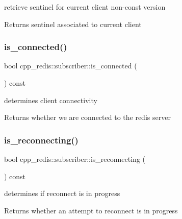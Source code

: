 retrieve sentinel for current client non-\/const version

\begin{DoxyReturn}{Returns}
sentinel associated to current client 
\end{DoxyReturn}
\mbox{\label{classcpp__redis_1_1subscriber_af73acfc3c1859e6b32bc9a69856e6e59}} 
\subsubsection{\texorpdfstring{is\+\_\+connected()}{is\_connected()}}
{\footnotesize\ttfamily bool cpp\+\_\+redis\+::subscriber\+::is\+\_\+connected (\begin{DoxyParamCaption}{ }\end{DoxyParamCaption}) const}



determines client connectivity 

\begin{DoxyReturn}{Returns}
whether we are connected to the redis server 
\end{DoxyReturn}
\mbox{\label{classcpp__redis_1_1subscriber_a8df4503f738566d2acab5f080cd44b53}} 
\subsubsection{\texorpdfstring{is\+\_\+reconnecting()}{is\_reconnecting()}}
{\footnotesize\ttfamily bool cpp\+\_\+redis\+::subscriber\+::is\+\_\+reconnecting (\begin{DoxyParamCaption}{ }\end{DoxyParamCaption}) const}



determines if reconnect is in progress 

\begin{DoxyReturn}{Returns}
whether an attempt to reconnect is in progress 
\end{DoxyReturn}
\mbox{\label{classcpp__redis_1_1subscriber_a52605edb2a85d370680c3c9e1b84fc3b}} 
